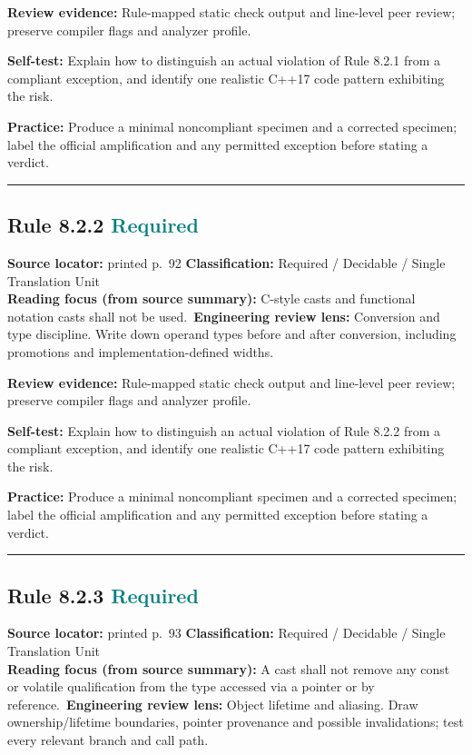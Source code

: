 \documentclass[10pt,letterpaper]{article}
\begin{document}
\textbf{Review evidence:} Rule-mapped static check output and line-level peer review; preserve compiler flags and analyzer profile.

\textbf{Self-test:} Explain how to distinguish an actual violation of Rule 8.2.1 from a compliant exception, and identify one realistic C++17 code pattern exhibiting the risk.\par
\textbf{Practice:} Produce a minimal noncompliant specimen and a corrected specimen; label the official amplification and any permitted exception before stating a verdict.
\smallskip\hrule\smallskip
\subsection*{Rule 8.2.2 \enspace \texorpdfstring{\small\textcolor{teal}{Required}}{Required}}
\noindent\textbf{Source locator:} printed p.~92 \quad\textbf{Classification:} Required / Decidable / Single Translation Unit\\
\textbf{Reading focus (from source summary):} C-style casts and functional notation casts shall not be used.\
\textbf{Engineering review lens:} Conversion and type discipline. Write down operand types before and after conversion, including promotions and implementation-defined widths.

\textbf{Review evidence:} Rule-mapped static check output and line-level peer review; preserve compiler flags and analyzer profile.

\textbf{Self-test:} Explain how to distinguish an actual violation of Rule 8.2.2 from a compliant exception, and identify one realistic C++17 code pattern exhibiting the risk.\par
\textbf{Practice:} Produce a minimal noncompliant specimen and a corrected specimen; label the official amplification and any permitted exception before stating a verdict.
\smallskip\hrule\smallskip
\subsection*{Rule 8.2.3 \enspace \texorpdfstring{\small\textcolor{teal}{Required}}{Required}}
\noindent\textbf{Source locator:} printed p.~93 \quad\textbf{Classification:} Required / Decidable / Single Translation Unit\\
\textbf{Reading focus (from source summary):} A cast shall not remove any const or volatile qualification from the type accessed via a pointer or by reference.\
\textbf{Engineering review lens:} Object lifetime and aliasing. Draw ownership/lifetime boundaries, pointer provenance and possible invalidations; test every relevant branch and call path.
\end{document}
